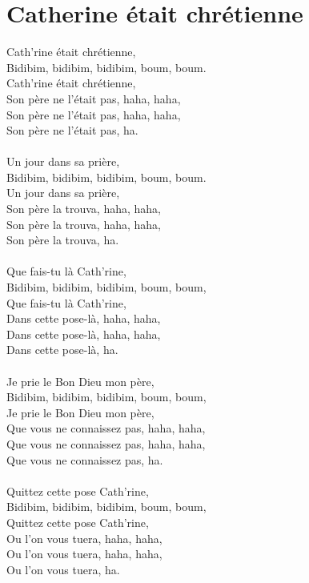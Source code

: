 \section*{Catherine était chrétienne}
Cath'rine était chrétienne,\\
Bidibim, bidibim, bidibim, boum, boum.\\
Cath'rine était chrétienne,\\
Son père ne l'était pas, haha, haha,\\
Son père ne l'était pas, haha, haha,\\
Son père ne l'était pas, ha.\\
\\
Un jour dans sa prière,\\
Bidibim, bidibim, bidibim, boum, boum.\\
Un jour dans sa prière,\\
Son père la trouva, haha, haha,\\
Son père la trouva, haha, haha,\\
Son père la trouva, ha.\\
\\
Que fais-tu là Cath'rine,\\
Bidibim, bidibim, bidibim, boum, boum,\\
Que fais-tu là Cath'rine,\\
Dans cette pose-là, haha, haha,\\
Dans cette pose-là, haha, haha,\\
Dans cette pose-là, ha.\\
\\
Je prie le Bon Dieu mon père,\\
Bidibim, bidibim, bidibim, boum, boum,\\
Je prie le Bon Dieu mon père,\\
Que vous ne connaissez pas, haha, haha,\\
Que vous ne connaissez pas, haha, haha,\\
Que vous ne connaissez pas, ha.\\
\\
Quittez cette pose Cath'rine,\\
Bidibim, bidibim, bidibim, boum, boum,\\
Quittez cette pose Cath'rine,\\
Ou l'on vous tuera, haha, haha,\\
Ou l'on vous tuera, haha, haha,\\
Ou l'on vous tuera, ha.\\
